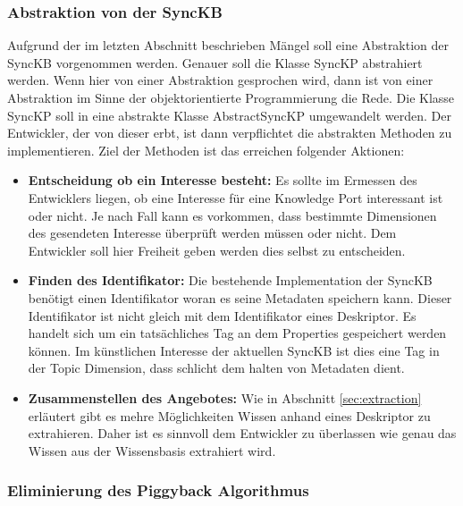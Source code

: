 \documentclass[a4paper]{article}
\begin{document}
	\subsubsection{Abstraktion von der SyncKB}
	
	Aufgrund der im letzten Abschnitt beschrieben Mängel soll eine Abstraktion der
	SyncKB vorgenommen werden. Genauer soll die Klasse SyncKP abstrahiert werden.
	Wenn hier von einer Abstraktion gesprochen wird, dann ist von einer Abstraktion 
	im Sinne der objektorientierte Programmierung die Rede. Die Klasse SyncKP soll in
	eine abstrakte Klasse AbstractSyncKP umgewandelt werden. Der Entwickler, der
	von dieser erbt, ist dann verpflichtet die abstrakten Methoden 
	zu implementieren. Ziel der Methoden ist das erreichen folgender Aktionen:
	
	\begin{itemize}
		\item \textbf{Entscheidung ob ein Interesse besteht:} Es sollte im 
		Ermessen des Entwicklers liegen, ob eine Interesse
		für eine Knowledge Port interessant ist oder nicht. Je nach Fall kann
		es vorkommen, dass bestimmte Dimensionen des gesendeten Interesse überprüft
		werden müssen oder nicht. Dem Entwickler soll hier Freiheit geben werden
		dies selbst zu entscheiden.
		\item \textbf{Finden des Identifikator:} Die bestehende Implementation der
		SyncKB benötigt einen Identifikator woran es seine Metadaten speichern
		kann. Dieser Identifikator ist nicht gleich mit dem Identifikator eines
		Deskriptor. Es handelt sich um ein tatsächliches Tag an dem Properties
		gespeichert werden können. Im künstlichen Interesse der aktuellen SyncKB
		ist dies eine Tag in der Topic Dimension, dass schlicht dem halten von
		Metadaten dient.
		\item \textbf{Zusammenstellen des Angebotes:} Wie in Abschnitt
		\ref{sec:extraction} erläutert gibt es mehre Möglichkeiten Wissen
		anhand eines Deskriptor zu extrahieren. Daher ist es sinnvoll dem
		Entwickler zu überlassen wie genau das Wissen aus der Wissensbasis
		extrahiert wird. 
	\end{itemize} 	
	
	\subsubsection{Eliminierung des Piggyback Algorithmus}
	\label{sec:piggyback}
	
\end{document}
